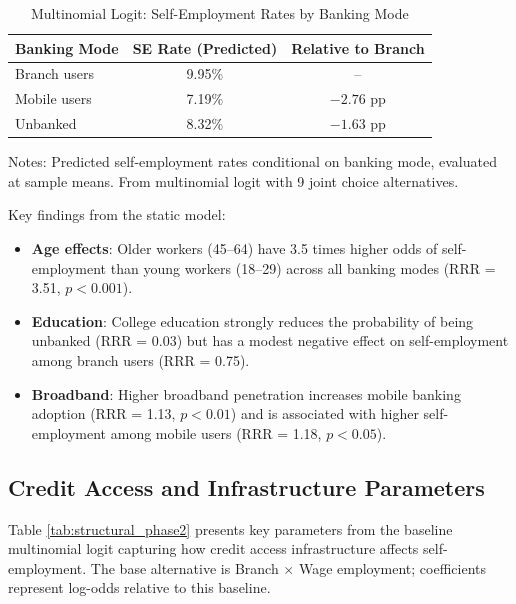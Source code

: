 \documentclass[12pt]{article}
\begin{document}
\begin{table}[H]
\centering
\caption{Multinomial Logit: Self-Employment Rates by Banking Mode}
\label{tab:structural_phase1}
\begin{threeparttable}
\begin{tabular}{lcc}
\toprule
Banking Mode & SE Rate (Predicted) & Relative to Branch \\
\midrule
Branch users & 9.95\% & -- \\
Mobile users & 7.19\% & $-2.76$ pp \\
Unbanked & 8.32\% & $-1.63$ pp \\
\bottomrule
\end{tabular}
\begin{tablenotes}
\small
\item Notes: Predicted self-employment rates conditional on banking mode, evaluated at sample means. From multinomial logit with 9 joint choice alternatives.
\end{tablenotes}
\end{threeparttable}
\end{table}

Key findings from the static model:

\begin{itemize}
    \item \textbf{Age effects}: Older workers (45--64) have 3.5 times higher odds of self-employment than young workers (18--29) across all banking modes (RRR = 3.51, $p < 0.001$).

    \item \textbf{Education}: College education strongly reduces the probability of being unbanked (RRR = 0.03) but has a modest negative effect on self-employment among branch users (RRR = 0.75).

    \item \textbf{Broadband}: Higher broadband penetration increases mobile banking adoption (RRR = 1.13, $p < 0.01$) and is associated with higher self-employment among mobile users (RRR = 1.18, $p < 0.05$).
\end{itemize}

\subsection{Credit Access and Infrastructure Parameters}

Table \ref{tab:structural_phase2} presents key parameters from the baseline multinomial logit capturing how credit access infrastructure affects self-employment. The base alternative is Branch $\times$ Wage employment; coefficients represent log-odds relative to this baseline.
\end{document}
